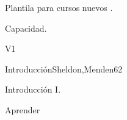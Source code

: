 
\begin{syllabus}


\begin{justification}
   Plantila para cursos nuevos .
   \end{justification}
   
   \begin{goals}
   \item Capacidad.
   \end{goals}
   
   \begin{outcomes}{V1}
      \item {}
   \end{outcomes}
   
   \begin{unit}{Introducción}{}{Sheldon,Menden}{6}{2}
   \begin{topics}
         \item Introducción I.
      \end{topics}
   
      \begin{learningoutcomes}
         \item Aprender
      \end{learningoutcomes}
   \end{unit}
   
   
   
   
   
   
   \begin{coursebibliography}
   \end{coursebibliography}
   
   \end{syllabus}
   
